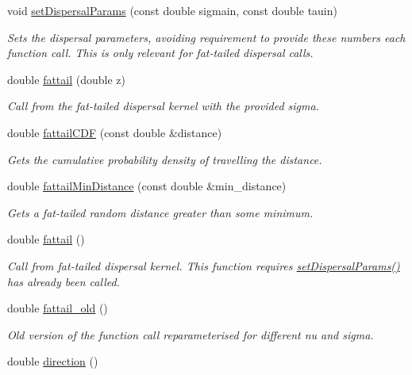 \begin{DoxyCompactItemize}
void \hyperlink{class_n_rrand_a5679f458940de730f527772ca27db5ad}{set\+Dispersal\+Params} (const double sigmain, const double tauin)
\begin{DoxyCompactList}\small\item\em Sets the dispersal parameters, avoiding requirement to provide these numbers each function call. This is only relevant for fat-\/tailed dispersal calls. \end{DoxyCompactList}\item 
double \hyperlink{class_n_rrand_a464101f3def678477f9156d0bd1aab54}{fattail} (double z)
\begin{DoxyCompactList}\small\item\em Call from the fat-\/tailed dispersal kernel with the provided sigma. \end{DoxyCompactList}\item 
double \hyperlink{class_n_rrand_a66a9362387e7421623d5e987a68b186e}{fattail\+C\+DF} (const double \&distance)
\begin{DoxyCompactList}\small\item\em Gets the cumulative probability density of travelling the distance. \end{DoxyCompactList}\item 
double \hyperlink{class_n_rrand_a67490e1351fd3f81d1e904a69e81ecdb}{fattail\+Min\+Distance} (const double \&min\+\_\+distance)
\begin{DoxyCompactList}\small\item\em Gets a fat-\/tailed random distance greater than some minimum. \end{DoxyCompactList}\item 
double \hyperlink{class_n_rrand_a3ec8aae87ae486ddfb5ad481a7972c27}{fattail} ()
\begin{DoxyCompactList}\small\item\em Call from fat-\/tailed dispersal kernel. This function requires \hyperlink{class_n_rrand_a5679f458940de730f527772ca27db5ad}{set\+Dispersal\+Params()} has already been called. \end{DoxyCompactList}\item 
double \hyperlink{class_n_rrand_aab0ec97e2c0f74cf38cc7047356cae5c}{fattail\+\_\+old} ()
\begin{DoxyCompactList}\small\item\em Old version of the function call reparameterised for different nu and sigma. \end{DoxyCompactList}\item 
double \hyperlink{class_n_rrand_aef021289f62893215204589af450bf65}{direction} ()

\end{DoxyCompactItemize}
